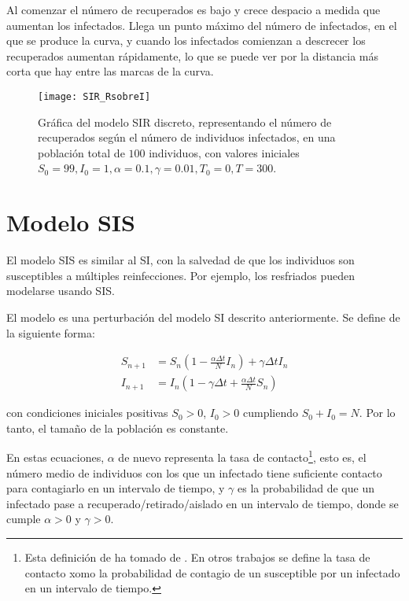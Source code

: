 Al comenzar el número de recuperados es bajo y crece despacio a medida que aumentan los infectados. Llega un punto máximo del número de infectados, en el que se produce la curva, y cuando los infectados comienzan a descrecer los recuperados aumentan rápidamente, lo que se puede ver por la distancia más corta que hay entre las marcas de la curva.

\begin{figure}
\begin{center}

\caption{Gráfica del modelo SIR discreto, representando el número de recuperados según el número de individuos infectados, en una población total de $100$ individuos, con valores iniciales $S_0=99, I_0 = 1, \alpha = 0.1, \gamma=0.01, T_0 = 0, T = 300$.}
\label{fig: SIR_RsobreI}
\texttt{[image: SIR\_RsobreI]}
\end{center}
\end{figure}

\section{Modelo SIS}
El modelo SIS es similar al SI, con la salvedad de que los individuos son susceptibles a múltiples reinfecciones.
Por ejemplo, los resfriados pueden modelarse usando SIS.

El modelo es una perturbación del modelo SI descrito anteriormente. Se define de la siguiente forma:

\begin{equation}
\label{eqn: modelo_SIS}
\begin{aligned}
S_{n+1} & = S_n \left(1-\frac{\alpha\Delta t}{N} I_n \right) + \gamma \Delta t I_n \\
I_{n+1} & = I_n \left( 1-\gamma \Delta t + \frac{\alpha\Delta t}{N} S_n \right)
\end{aligned}
\end{equation}

con condiciones iniciales positivas $S_0>0$, $I_0>0$ cumpliendo $S_0+I_0=N$. Por lo tanto, el tamaño de la población es constante.

En estas ecuaciones, $\alpha$ de nuevo representa la tasa de contacto\footnote{Esta definición de ha tomado de \cite{allenDiscretetimeSISIR1994}. En otros trabajos se define la tasa de contacto xomo la probabilidad de contagio de un susceptible por un infectado en un intervalo de tiempo.}, esto es, el número medio de individuos con los que un infectado tiene suficiente contacto para contagiarlo en un intervalo de tiempo, y $\gamma$ es la probabilidad de que un infectado pase a recuperado/retirado/aislado en un intervalo de tiempo, donde se cumple $\alpha >0$ y $\gamma >0$.

